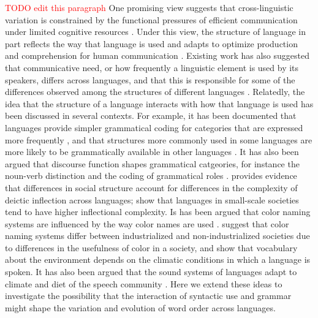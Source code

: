 \documentclass[9pt,twocolumn,twoside,lineno]{pnas-new}
\begin{document}
\textcolor{red}{TODO edit this paragraph}
One promising view suggests that cross-linguistic variation is constrained by the functional pressures of efficient communication under limited cognitive resources \citep{haspelmath2008parametric, jaeger2011on, kemp2018semantic, gibson2019how}.
Under this view, the structure of language in part reflects the way that language is used \citep{hopper1984the, bybee1994the, croft2000explaining, bybee2006from} and adapts to optimize production and comprehension for human communication \citep{hawkins-performance-1994, haspelmath2006against, bybee2010language}.
Existing work has also suggested that communicative need, or how frequently a linguistic element is used by its speakers, differs across languages, and that this is responsible for some of the differences observed among the structures of different languages \cite{perkins1992deixis, lupyan2010language, gibson2017color}. %
Relatedly, the idea that the structure of a language interacts with how that language is used has been discussed in several contexts.
For example, it has  been documented that languages provide simpler grammatical coding for categories that are expressed more frequently \citep{greenberg1966language, haspelmath2006against}, and that structures more commonly used in some languages are more likely to be grammatically available in other languages \citep{keenan1975variation}.
It has also been argued that discourse function shapes grammatical catgeories, for instance the noun-verb distinction \citep{hopper1984the} and the coding of grammatical roles \citep{bois1987the}.
\cite{perkins1992deixis} provides evidence that differences in social structure account for differences in the complexity of deictic inflection across languages; \cite{lupyan2010language} show that languages in small-scale societies tend to have higher inflectional complexity.
Is has been argued that color naming systems are influenced by the way color names are used \cite{zaslavsky2019color}.
\cite{gibson2017color} suggest that color naming systems differ between industrialized and non-industrialized societies due to differences in the usefulness of color in a society, and \cite{regier2016languages} show that vocabulary about the environment depends on the climatic conditions in which a language is spoken.
It has also been argued that the sound systems of languages adapt to climate and diet of the speech community \citep{everett2015climate,blasi2019human}. Here we extend these ideas to investigate the possibility that the interaction of syntactic use and grammar might shape the variation and evolution of word order across languages.
\end{document}
